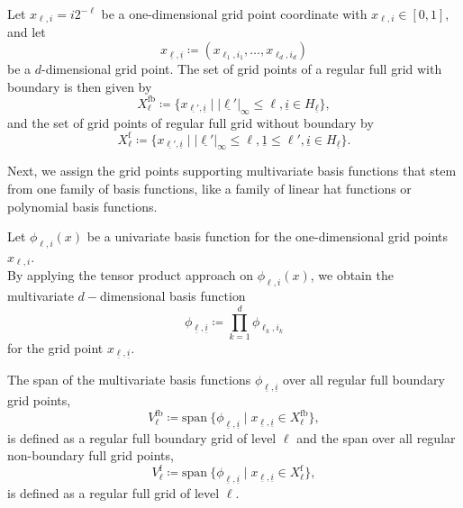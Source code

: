 \documentclass[
  a4paper,  %
  twoside,  %
  bibliography=totoc,
  headsepline,
  cleardoublepage=empty,
  parskip=half,
  draft=false
]{scrbook}
\begin{document}
\begin{definition}
Let $x_{\ell,i}=i2^{-\ell}$ be a one-dimensional grid point coordinate with $x_{\ell,i} \in [0,1]$, and let
\begin{equation}
x_{\underline{\ell},\underline{i}} \coloneqq (x_{\ell_1,i_1}, \dots, x_{\ell_d,i_d})
\end{equation}
be a $d$-dimensional grid point. The set of grid points of a regular full grid with boundary is then given by
\begin{equation}
X^{\mathrm{fb}}_{\ell} \coloneqq \{x_{\underline{\ell'},\underline{i}} \mid |\underline{\ell'}|_{\infty} \leq \ell, \underline{i} \in H_{\underline{\ell}}\},
\nonumber
\end{equation}
and the set of grid points of regular full grid without boundary by
\begin{equation}
X^{\mathrm{f}}_{\ell} \coloneqq \{x_{\underline{\ell'},\underline{i}} \mid |\underline{\ell'}|_{\infty} \leq \ell, \underline{1} \leq \ell',  \underline{i} \in H_{\underline{\ell}}\}.
\nonumber
\end{equation}
\end{definition}
%
Next, we assign the grid points supporting multivariate basis functions that stem from one family of basis functions, like a family of linear hat functions or polynomial basis functions.

\begin{definition}
Let $\phi_{\ell,i}(x)$ be a univariate basis function for the one-dimensional grid points $x_{\ell,i}$.\\
By applying the tensor product approach on $\phi_{\ell,i}(x)$, we obtain the multivariate $d-$dimensional basis function
\begin{equation}
\phi_{\underline{\ell},\underline{i}} \coloneqq \prod_{k=1}^{d} \phi_{\ell_k,i_k}
\label{eq:basis_functions}
\end{equation}
for the grid point $x_{\underline{\ell},\underline{i}}$.
\end{definition}
%
\begin{definition}
The span of the multivariate basis functions $\phi_{\underline{\ell},\underline{i}}$ over all regular full boundary grid points,
\begin{equation}
V^{\mathrm{fb}}_{\ell} \coloneqq \mathrm{span}~ \{\phi_{\underline{\ell},\underline{i}} \mid x_{\underline{\ell},\underline{i}} \in X^{\mathrm{fb}}_{\ell}\},
\nonumber
\end{equation}
is defined as a regular full boundary grid of level $\ell$ and the span over all regular non-boundary full grid points,
\begin{equation}
V^{\mathrm{f}}_{\ell} \coloneqq \mathrm{span}~ \{\phi_{\underline{\ell},\underline{i}} \mid x_{\underline{\ell},\underline{i}} \in X^{\mathrm{f}}_{\ell}\},
\nonumber
\end{equation}
is defined as a regular full grid of level $\ell$.
\label{def:full_grid}
\end{definition}
\end{document}
